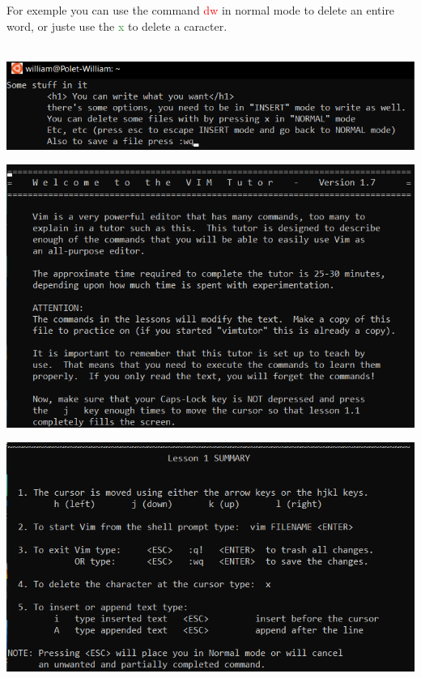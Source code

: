 \documentclass{article}
\begin{document}
For exemple you can use the command \textcolor{red}{dw} in normal mode to delete an entire word, or juste use the \textcolor{ForestGreen}{x} to delete a caracter. \\ \\
\begin{center}
    \includegraphics[scale=1]{Vim.png}
\end{center}
\begin{minipage}[c]{0.55\textwidth}
    \includegraphics[scale=0.6]{VimTutor1.png}
\end{minipage}
\begin{minipage}[c]{0.5\textwidth}
    \includegraphics[scale=0.6]{VimTutor2.png}
\end{minipage}
\end{document}
